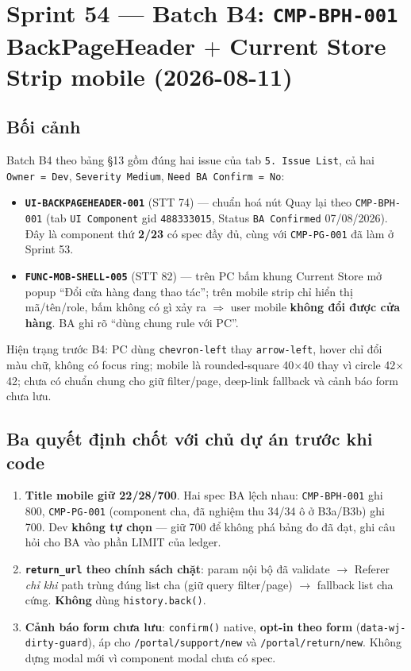 \chapter{Sprint 54 --- Batch B4: \texttt{CMP-BPH-001} BackPageHeader $+$ Current Store Strip mobile (2026-08-11)}

\section{Bối cảnh}

Batch B4 theo bảng §13 gồm đúng hai issue của tab \texttt{5. Issue List}, cả hai
\texttt{Owner = Dev}, \texttt{Severity Medium}, \texttt{Need BA Confirm = No}:

\begin{itemize}
\item \textbf{\texttt{UI-BACKPAGEHEADER-001}} (STT 74) --- chuẩn hoá nút Quay lại theo
  \texttt{CMP-BPH-001} (tab \texttt{UI Component} gid \texttt{488333015}, Status
  \texttt{BA Confirmed} 07/08/2026). Đây là component thứ \textbf{2/23} có spec đầy đủ, cùng
  với \texttt{CMP-PG-001} đã làm ở Sprint 53.
\item \textbf{\texttt{FUNC-MOB-SHELL-005}} (STT 82) --- trên PC bấm khung Current Store mở
  popup ``Đổi cửa hàng đang thao tác''; trên mobile strip chỉ hiển thị mã/tên/role, bấm không
  có gì xảy ra $\Rightarrow$ user mobile \textbf{không đổi được cửa hàng}. BA ghi rõ ``dùng
  chung rule với PC''.
\end{itemize}

Hiện trạng trước B4: PC dùng \texttt{chevron-left} thay \texttt{arrow-left}, hover chỉ đổi màu
chữ, không có focus ring; mobile là rounded-square 40$\times$40 thay vì circle 42$\times$42;
chưa có chuẩn chung cho giữ filter/page, deep-link fallback và cảnh báo form chưa lưu.

\section{Ba quyết định chốt với chủ dự án trước khi code}

\begin{enumerate}
\item \textbf{Title mobile giữ 22/28/\textbf{700}}. Hai spec BA lệch nhau: \texttt{CMP-BPH-001}
  ghi 800, \texttt{CMP-PG-001} (component cha, đã nghiệm thu 34/34 ô ở B3a/B3b) ghi 700. Dev
  \textbf{không tự chọn} --- giữ 700 để không phá bảng đo đã đạt, ghi câu hỏi cho BA vào phần
  LIMIT của ledger.
\item \textbf{\texttt{return\_url} theo chính sách chặt}: param nội bộ đã validate
  $\rightarrow$ Referer \emph{chỉ khi} path trùng đúng list cha (giữ query filter/page)
  $\rightarrow$ fallback list cha cứng. \textbf{Không} dùng \texttt{history.back()}.
\item \textbf{Cảnh báo form chưa lưu}: \texttt{confirm()} native, \textbf{opt-in theo form}
  (\texttt{data-wj-dirty-guard}), áp cho \texttt{/portal/support/new} và
  \texttt{/portal/return/new}. Không dựng modal mới vì component modal chưa có spec.
\end{enumerate}

